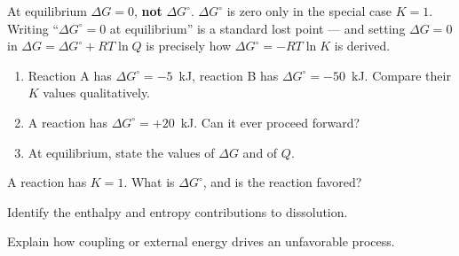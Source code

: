 \documentclass{apchem-notes}
\begin{document}
\begin{apctrap}
At equilibrium $\Delta G = 0$, \textbf{not} $\Delta G^\circ$. $\Delta G^\circ$
is zero only in the special case $K = 1$. Writing ``$\Delta G^\circ = 0$ at
equilibrium'' is a standard lost point --- and setting $\Delta G = 0$ in
$\Delta G = \Delta G^\circ + RT\ln Q$ is precisely how
$\Delta G^\circ = -RT\ln K$ is derived.
\end{apctrap}


\begin{enumerate}[leftmargin=*,itemsep=0.4em]
  \item Reaction A has $\Delta G^\circ = -5$~kJ, reaction B has
        $\Delta G^\circ = -50$~kJ. Compare their $K$ values qualitatively.
  \item A reaction has $\Delta G^\circ = +20$~kJ. Can it ever proceed
        forward? 
  \item At equilibrium, state the values of $\Delta G$ and of $Q$.
\end{enumerate}

\begin{exitticket}
A reaction has $K = 1$. What is $\Delta G^\circ$, and is the reaction
favored?
\end{exitticket}


\begin{objectives}
  \item Identify the enthalpy and entropy contributions to dissolution.
  \item Explain how coupling or external energy drives an unfavorable
        process.
\end{objectives}
\end{document}
